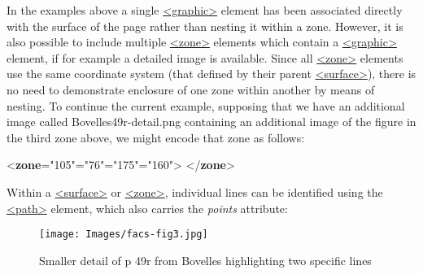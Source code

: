 In the examples above a single \hyperref[TEI.graphic]{<graphic>} element has been associated directly with the surface of the page rather than nesting it within a zone. However, it is also possible to include multiple \hyperref[TEI.zone]{<zone>} elements which contain a \hyperref[TEI.graphic]{<graphic>} element, if for example a detailed image is available. Since all \hyperref[TEI.zone]{<zone>} elements use the same coordinate system (that defined by their parent \hyperref[TEI.surface]{<surface>}), there is no need to demonstrate enclosure of one zone within another by means of nesting. To continue the current example, supposing that we have an additional image called \textsf{Bovelles49r-detail.png} containing an additional image of the figure in the third zone above, we might encode that zone as follows: \par\bgroup{}\exampleFont \begin{shaded}\noindent\mbox{}{<\textbf{zone}\hspace*{1em}{ulx}="{105}"\hspace*{1em}{uly}="{76}"\hspace*{1em}{lrx}="{175}"\hspace*{1em}{lry}="{160}">}\mbox{}\newline 
{}\mbox{}\newline 
{</\textbf{zone}>}\end{shaded}\egroup\par \par
Within a \hyperref[TEI.surface]{<surface>} or \hyperref[TEI.zone]{<zone>}, individual lines can be identified using the \hyperref[TEI.path]{<path>} element, which also carries the {\itshape points} attribute: \begin{figure}[htbp]
\noindent\noindent\texttt{[image: Images/facs-fig3.jpg]}
\caption{\label{facs-fig3}Smaller detail of p 49r from Bovelles highlighting two specific lines}\end{figure}
